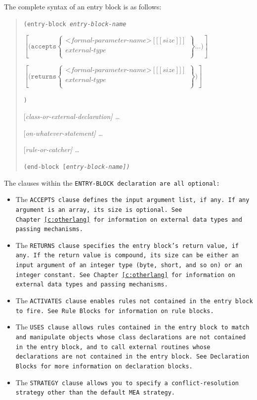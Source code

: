 The complete syntax of an entry block is as follows:
\begin{quote}
  \tt{(entry-block} \it{entry-block-name}
  
  \qquad$\left[\texttt{(accepts} \left\{\substack{
      \texttt{<}\textit{formal-parameter-name}\texttt{>}
      [\texttt{[}[\textit{size}]\texttt{]}] \\
      \textit{external-type} \\
      [\textit{passing-mechanism}]
    }\right\}
  \ldots\texttt{)}\right]$

\qquad$\left[
\texttt{(returns} \left\{\substack{
      \texttt{<}\textit{formal-parameter-name}\texttt{>}
      [\texttt{[}[\textit{size}]\texttt{]}] \\
      \textit{external-type} \\
      [\textit{passing-mechanism}]
    }\right\}
  \texttt{)}\right]$



\tt{)}

[\it{class-or-external-declaration}] \ldots

[\it{on-whatever-statement}] \ldots

[\it{rule-or-catcher}] \ldots

\tt{(end-block} [\it{entry-block-name}]\tt{)}
\end{quote}

The clauses within the \tt{ENTRY-BLOCK} declaration are all optional:

\begin{itemize}
\item The \tt{ACCEPTS} clause defines the input argument list, if
  any. If any argument is an array, its size is optional. See
  Chapter~\ref{c:otherlang} for information on external data types and
  passing mechanisms.
\item The \tt{RETURNS} clause specifies the entry block's return
  value, if any. If the return value is compound, its size can be
  either an input argument of an integer type (byte, short, and so on)
  or an integer constant. See Chapter~\ref{c:otherlang} for
  information on external data types and passing mechanisms.
\item The \tt{ACTIVATES} clause enables rules not contained in the
  entry block to fire. See Rule Blocks for information on rule blocks.
\item The \tt{USES} clause allows rules contained in the entry block
  to match and manipulate objects whose class declarations are not
  contained in the entry block, and to call external routines whose
  declarations are not contained in the entry block. See Declaration
  Blocks for more information on declaration blocks.
\item The \tt{STRATEGY} clause allows you to specify a
  conflict-resolution strategy other than the default \tt{MEA}
  strategy.
\end{itemize}
  
